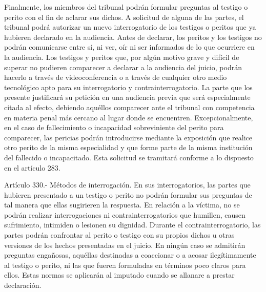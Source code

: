     Finalmente, los miembros del tribunal podrán formular preguntas al testigo o perito con el fin de aclarar sus dichos.
    A solicitud de alguna de las partes, el tribunal podrá autorizar un nuevo interrogatorio de los testigos o peritos que ya hubieren declarado en la audiencia.
    Antes de declarar, los peritos y los testigos no podrán comunicarse entre sí, ni ver, oír ni ser informados de lo que ocurriere en la audiencia.
    Los testigos y peritos que, por algún motivo grave y difícil de superar no pudieren comparecer a declarar a la audiencia del juicio, podrán hacerlo a través de videoconferencia o a través de cualquier otro medio tecnológico apto para su interrogatorio y contrainterrogatorio. La parte que los presente justificará su petición en una audiencia previa que será especialmente citada al efecto, debiendo aquéllos comparecer ante el tribunal con competencia en materia penal más cercano al lugar donde se encuentren.
    Excepcionalmente, en el caso de fallecimiento o incapacidad sobreviniente del perito para comparecer, las pericias podrán introducirse mediante la exposición que realice otro perito de la misma especialidad y que forme parte de la misma institución del fallecido o incapacitado. Esta solicitud se tramitará conforme a lo dispuesto en el artículo 283.


    Artículo 330.- Métodos de interrogación. En sus interrogatorios, las partes que hubieren presentado a un testigo o perito no podrán formular sus preguntas de tal manera que ellas sugirieren la respuesta.
    En relación a la víctima, no se podrán realizar interrogaciones ni contrainterrogatorios que humillen, causen sufrimiento, intimiden o lesionen su dignidad.
    Durante el contrainterrogatorio, las partes podrán confrontar al perito o testigo con su propios dichos u otras versiones de los hechos presentadas en el juicio.
    En ningún caso se admitirán preguntas engañosas, aquéllas destinadas a coaccionar o a acosar ilegítimamente al testigo o perito, ni las que fueren formuladas en términos poco claros para ellos.
    Estas normas se aplicarán al imputado cuando se allanare a prestar declaración.

